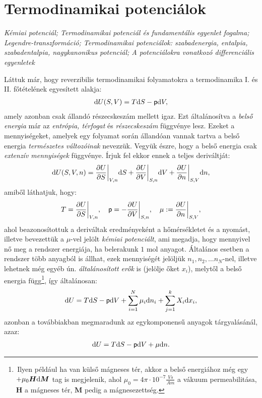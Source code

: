 \section{Termodinamikai potenciálok}
\emph{Kémiai potenciál; Termodinamikai potenciál és fundamentális egyenlet fogalma; Legendre-transzformáció; Termodinamikai potenciálok: szabadenergia, entalpia, szabadentalpia, nagykanonikus potenciál; A potenciálokra vonatkozó differenciális egyenletek}

Láttuk már, hogy reverzibilis termodinamikai folyamatokra a termodinamika I. és II. főtételének egyesített alakja:
\begin{align}
	\mathrm{d}U(S,V) = T\mathrm{d}S-\mathsf p\mathrm{d}V,
\end{align}
amely azonban csak állandó részecskeszám mellett igaz. Ezt általánosítva a \emph{belső energia} már az \emph{entrópia, térfogat} és \emph{részecskeszám} függvénye lesz. Ezeket a mennyiségeket, amelyek egy folyamat során állandóan vannak tartva a belső energia \emph{természetes változóinak} nevezzük. Vegyük észre, hogy a belső energia csak \emph{extenzív mennyiségek} függvénye.
Írjuk fel ekkor ennek a teljes deriváltját:
\begin{align}
	\mathrm{d}U(S,V,n) = \frac{\partial{U}}{\partial{S}}\bigg|_{V,n}\mathrm{d}S + \frac{\partial{U}}{\partial{V}}\bigg|_{S,n}\mathrm{d}V + \frac{\partial{U}}{\partial{n}}\bigg|_{S,V}\mathrm{d}n,
\end{align}
amiből láthatjuk, hogy:
\begin{align}
	T=\frac{\partial{U}}{\partial{S}}\bigg|_{V,n},\quad \mathsf p = -\frac{\partial{U}}{\partial{V}}\bigg|_{S,n},\quad \mu:=\frac{\partial{U}}{\partial{n}}\bigg|_{S,V},
\end{align}
ahol beazonosítottuk a deriváltak eredményeként a hőmérsékletet és a nyomást, illetve bevezettük a $\mu$-vel jelölt \emph{kémiai potenciált}, ami megadja, hogy mennyivel nő meg a rendszer energiája, ha belerakunk $1$ mol anyagot. Általános esetben a rendszer több anyagból is állhat, ezek mennyiségét jelöljük $n_1,n_2,\dots n_N$-nel, illetve lehetnek még egyéb ún. \emph{általánosított erők} is (jelölje őket $x_i$), melytől a belső energia függ\footnote{\,Ilyen például ha van külső mágneses tér, akkor a belső energiához még egy $+\mu_0\bm H \mathrm{d} \bm M$ tag is megjelenik, ahol $\mu_0 = 4\pi \cdot 10^{-7}\frac{Vs}{Am}$ a vákuum permeabilitása, $\bm H$ a mágneses tér, $\bm M$ pedig a mágnesezettség.}, így általánosan:
\begin{align}
	\mathrm{d}U = T\mathrm{d}S-\mathsf p \mathrm{d}V + \sum_{i=1}^N \mu_i \mathrm{d}n_i + \sum_{j=1}^k X_i \mathrm{d}x_i,
\end{align} 
azonban a továbbiakban megmaradunk az egykomponensű anyagok tárgyalásánál, azaz:
\begin{align}\label{eq:U}
	\mathrm{d}U = T\mathrm{d}S-\mathsf p \mathrm{d}V + \mu \mathrm{d}n.
\end{align}
